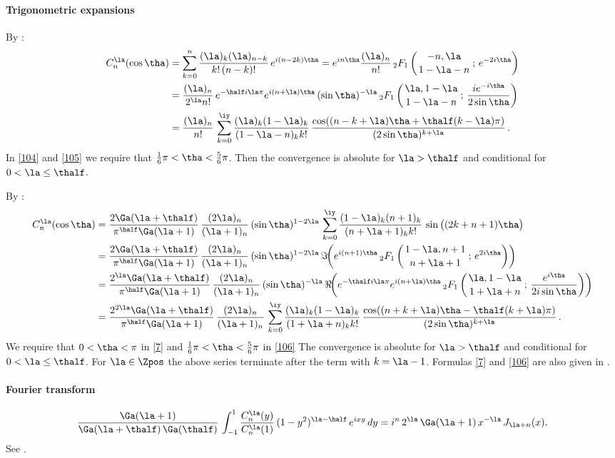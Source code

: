 \documentclass[envcountchap,graybox]{svmono}
\newcommand{\hyp}[5]{\mbox{}_{#1}{F}_{#2}
\left(\genfrac{}{}{0pt}{}{#3}{#4}\,;\,#5\right)}
\begin{document}
\paragraph{Trigonometric expansions}
By :
\begin{align}
C_n^{\la}(\cos\tha)
&=\sum_{k=0}^n\frac{(\la)_k(\la)_{n-k}}{k!\,(n-k)!}\,e^{i(n-2k)\tha}
=e^{in\tha}\frac{(\la)_n}{n!}\,
\hyp21{-n,\la}{1-\la-n}{e^{-2i\tha}}\label{103}\\
&=\frac{(\la)_n}{2^\la n!}\,
e^{-\half i\la\pi}e^{i(n+\la)\tha}\,(\sin\tha)^{-\la}\,
\hyp21{\la,1-\la}{1-\la-n}{\frac{i e^{-i\tha}}{2\sin\tha}}\label{104}\\
&=\frac{(\la)_n}{n!}\,\sum_{k=0}^\iy\frac{(\la)_k(1-\la)_k}{(1-\la-n)_k k!}\,
\frac{\cos((n-k+\la)\tha+\thalf(k-\la)\pi)}{(2\sin\tha)^{k+\la}}\,.\label{105}
\end{align}
In \eqref{104} and \eqref{105} we require that
$\tfrac16\pi<\tha<\tfrac56\pi$. Then the convergence is absolute for $\la>\thalf$
and conditional for $0<\la\le\thalf$.

By \mycite{DLMF}{(14.13.1), (14.3.21), (15.8.1)]}:
\begin{align}
C_n^\la(\cos\tha)&=\frac{2\Ga(\la+\thalf)}{\pi^\half\Ga(\la+1)}\,
\frac{(2\la)_n}{(\la+1)_n}\,(\sin\tha)^{1-2\la}\,
\sum_{k=0}^\iy\frac{(1-\la)_k(n+1)_k}{(n+\la+1)_k k!}\,
\sin\big((2k+n+1)\tha\big)
\label{7}\\
&=\frac{2\Ga(\la+\thalf)}{\pi^\half\Ga(\la+1)}\,
\frac{(2\la)_n}{(\la+1)_n}\,(\sin\tha)^{1-2\la}\,
\Im\!\!\left(e^{i(n+1)\tha}\,\hyp21{1-\la,n+1}{n+\la+1}{e^{2i\tha}}\right)\nonumber\\
&=\frac{2^\la\Ga(\la+\thalf)}{\pi^\half\Ga(\la+1)}\,
\frac{(2\la)_n}{(\la+1)_n}\,(\sin\tha)^{-\la}\,
\Re\!\!\left(e^{-\thalf i\la\pi}e^{i(n+\la)\tha}\,
\hyp21{\la,1-\la}{1+\la+n}{\frac{e^{i\tha}}{2i\sin\tha}}\right)\nonumber\\
&=\frac{2^{2\la}\Ga(\la+\thalf)}{\pi^\half\Ga(\la+1)}\,\frac{(2\la)_n}{(\la+1)_n}\,
\sum_{k=0}^\iy\frac{(\la)_k(1-\la)_k}{(1+\la+n)_k k!}\,
\frac{\cos((n+k+\la)\tha-\thalf(k+\la)\pi)}{(2\sin\tha)^{k+\la}}\,.
\label{106}
\end{align}
We require that $0<\tha<\pi$ in \eqref{7} and $\tfrac16\pi<\tha<\tfrac56\pi$ in
\eqref{106} The convergence is absolute for $\la>\thalf$ and conditional for
$0<\la\le\thalf$.
For $\la\in\Zpos$ the above series terminate after the term with
$k=\la-1$.
Formulas \eqref{7} and \eqref{106} are also given in
.
%
\paragraph{Fourier transform}
\begin{equation}
\frac{\Ga(\la+1)}{\Ga(\la+\thalf)\,\Ga(\thalf)}\,
\int_{-1}^1 \frac{C_n^\la(y)}{C_n^\la(1)}\,(1-y^2)^{\la-\half}\,
e^{ixy}\,dy
=i^n\,2^\la\,\Ga(\la+1)\,x^{-\la}\,J_{\la+n}(x).
\label{8}
\end{equation}
See .
%
\end{document}
